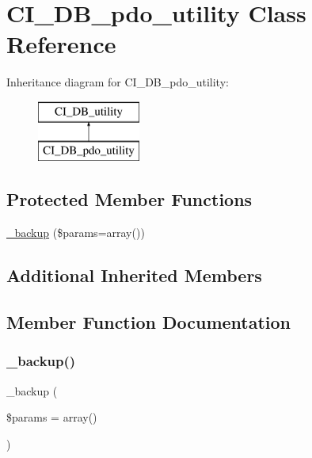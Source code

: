 \hypertarget{class_c_i___d_b__pdo__utility}{}\section{C\+I\+\_\+\+D\+B\+\_\+pdo\+\_\+utility Class Reference}
\label{class_c_i___d_b__pdo__utility}
Inheritance diagram for C\+I\+\_\+\+D\+B\+\_\+pdo\+\_\+utility\+:\begin{figure}[H]
\begin{center}
\leavevmode
\includegraphics[height=2.000000cm]{class_c_i___d_b__pdo__utility}
\end{center}
\end{figure}
\subsection*{Protected Member Functions}
\begin{DoxyCompactItemize}
\item 
\mbox{\hyperlink{class_c_i___d_b__pdo__utility_a30f3053d2c82e7562349924363507afa}{\+\_\+backup}} (\$params=array())
\end{DoxyCompactItemize}
\subsection*{Additional Inherited Members}


\subsection{Member Function Documentation}
\mbox{\label{class_c_i___d_b__pdo__utility_a30f3053d2c82e7562349924363507afa}} 
\subsubsection{\texorpdfstring{\+\_\+backup()}{\_backup()}}
{\footnotesize\ttfamily \+\_\+backup (\begin{DoxyParamCaption}\item[{}]{\$params = {\ttfamily array()} }\end{DoxyParamCaption})\hspace{0.3cm}{\ttfamily [protected]}}


